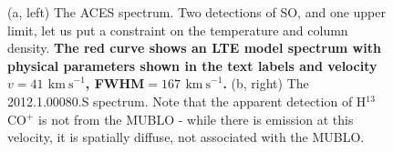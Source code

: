 \documentclass[]{aastex631}
\newcommand{\kms}{\ensuremath{\mathrm{km~s}^{-1}}\xspace}
\def\rr#1{\textbf{#1}}
\begin{document}
\begin{figure}[!ht]
    \centering
    \caption{(a, left) The ACES spectrum. Two detections of SO, and one upper limit, let us put a constraint on the temperature and column density. %
    \rr{The red curve shows an LTE model spectrum with physical parameters shown in the text labels and velocity $v=41$ \kms, FWHM$=167$ \kms.}
    (b, right) The 2012.1.00080.S spectrum.
    Note that the apparent detection of H$^{13}$CO$^+$ is not from the MUBLO - while there is emission at this velocity, it is spatially diffuse, not associated with the MUBLO.
    }
    \label{fig:LTEmodel}
\end{figure}
\end{document}
